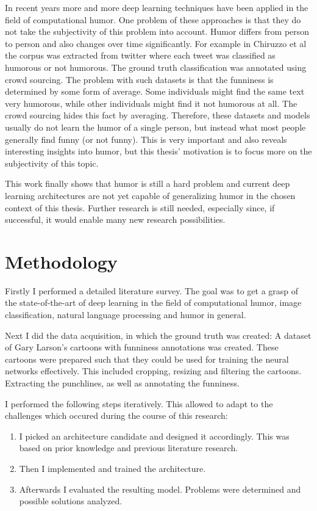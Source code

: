 \documentclass[draft,final,oneside]{vutinfth} %
\begin{document}
In recent years more and more deep learning techniques have been applied in the field of computational humor. One problem of these approaches is that they do not take the subjectivity of this problem into account. Humor differs from person to person and also changes over time significantly. For example in Chiruzzo et al \cite{chiruzzo2019overview} the corpus was extracted from twitter where each tweet was classified as humorous or not humorous. The ground truth classification was annotated using crowd sourcing. The problem with such datasets is that the funniness is determined by some form of average. Some individuals might find the same text very humorous, while other individuals might find it not humorous at all. The crowd sourcing hides this fact by averaging. Therefore, these datasets and models usually do not learn the humor of a single person, but instead what most people generally find funny (or not funny). This is very important and also reveals interesting insights into humor, but this thesis' motivation is to focus more on the subjectivity of this topic.

This work finally shows that humor is still a hard problem and current deep learning architectures are not yet capable of generalizing humor in the chosen context of this thesis. Further research is still needed, especially since, if successful, it would enable many new research possibilities.


\section{Methodology}

Firstly I performed a detailed literature survey. The goal was to get a grasp of the state-of-the-art of deep learning in the field of computational humor, image classification, natural language processing and humor in general.

Next I did the data acquisition, in which the ground truth was created: A dataset of Gary Larson's cartoons with funniness annotations was created. These cartoons were prepared such that they could be used for training the neural networks effectively. This included cropping, resizing and filtering the cartoons. Extracting the punchlines, as well as annotating the funniness.

I performed the following steps iteratively. This allowed to adapt to the challenges which occured during the course of this research:

\begin{enumerate}

\item I picked an architecture candidate and designed it accordingly. This was based on prior knowledge and previous literature research.
\item Then I implemented and trained the architecture.
\item Afterwards I evaluated the resulting model. Problems were determined and possible solutions analyzed.

\end{enumerate}
\end{document}
